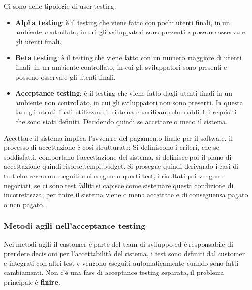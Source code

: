 Ci sono delle tipologie di user testing:
\begin{itemize}
    \item \textbf{Alpha testing}: è il testing che viene fatto con pochi utenti
    finali, in un ambiente controllato, in cui gli sviluppatori sono presenti
    e possono osservare gli utenti finali.
    \item \textbf{Beta testing}: è il testing che viene fatto con un numero maggiore
    di utenti finali, in un ambiente controllato, in cui gli sviluppatori sono
    presenti e possono osservare gli utenti finali.
    \item \textbf{Acceptance testing}: è il testing che viene fatto dagli utenti
    finali in un ambiente non controllato, in cui gli sviluppatori non sono presenti.
    In questa fase gli utenti finali utilizzano il sistema e verificano che soddisfi
    i requisiti che sono stati definiti. Decidendo quindi se accettare o meno il
    sistema.
\end{itemize}
Accettare il sistema implica l’avvenire del pagamento finale per il software, il
processo di accettazione è cosi strutturato:
Si definiscono i criteri, che se soddisfatti, comportano l’accettazione del sistema,
si definisce poi il piano di accettazione quindi risorse,tempi,budget. Si prosegue
quindi derivando i casi di test che verranno eseguiti e si eseguono questi test, i
risultati poi vengono negoziati, se ci sono test falliti si capisce come sistemare
questa condizione di incorrettezza, per finire il sistema viene o meno accettato e
di conseguenza pagato o non pagato.

\subsubsection{Metodi agili nell'acceptance testing}
Nei metodi agili il customer è parte del team di sviluppo ed è responsabile
di prendere decisioni per l’accettabilità del sistema, i test sono definiti
dal customer e integrati con altri test e vengono eseguiti automaticamente quando
sono fatti cambiamenti.
Non c’è una fase di acceptance testing separata, il problema principale è \textbf{finire}.